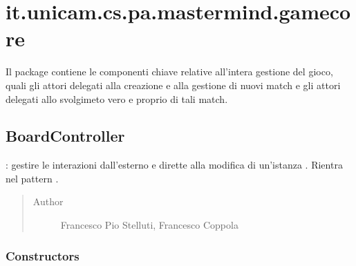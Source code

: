 \documentclass[letterpaper,10pt,italian,openany,oneside]{sphinxmanual}
\begin{document}
\section{it.unicam.cs.pa.mastermind.gamecore}
\label{\detokenize{source/it/unicam/cs/pa/mastermind/gamecore/package-index:it-unicam-cs-pa-mastermind-gamecore}}\label{\detokenize{source/it/unicam/cs/pa/mastermind/gamecore/package-index::doc}}
Il package contiene le componenti chiave relative all’intera gestione del gioco, quali gli attori delegati alla creazione e alla gestione di nuovi match e gli attori delegati allo svolgimeto vero e proprio di tali match.

\label{\detokenize{source/it/unicam/cs/pa/mastermind/gamecore/package-index:package-it.unicam.cs.pa.mastermind.gamecore}}

\subsection{BoardController}
\label{\detokenize{source/it/unicam/cs/pa/mastermind/gamecore/BoardController:boardcontroller}}\label{\detokenize{source/it/unicam/cs/pa/mastermind/gamecore/BoardController::doc}}

\begin{fulllineitems}
\label{\detokenize{source/it/unicam/cs/pa/mastermind/gamecore/BoardController:it.unicam.cs.pa.mastermind.gamecore.BoardController}}
: gestire le interazioni dall’esterno e dirette alla modifica di un’istanza . Rientra nel pattern .
\begin{quote}\begin{description}
\item[{Author}] \leavevmode
Francesco Pio Stelluti, Francesco Coppola

\end{description}\end{quote}

\end{fulllineitems}



\subsubsection{Constructors}
\label{\detokenize{source/it/unicam/cs/pa/mastermind/gamecore/BoardController:constructors}}
\end{document}
